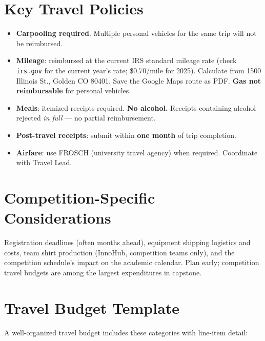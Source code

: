 \section{Key Travel Policies}
\begin{itemize}[nosep,leftmargin=1.5em]
\item \textbf{Carpooling required}. Multiple personal vehicles for the same trip will not be reimbursed.
\item \textbf{Mileage}: reimbursed at the current IRS standard mileage rate (check \texttt{irs.gov} for the current year's rate; \$0.70/mile for 2025). Calculate from 1500 Illinois St., Golden CO 80401. Save the Google Maps route as PDF. \textbf{Gas not reimbursable} for personal vehicles.
\item \textbf{Meals}: itemized receipts required. \textbf{No alcohol.} Receipts containing alcohol rejected \emph{in full} --- no partial reimbursement.
\item \textbf{Post-travel receipts}: submit within \textbf{one month} of trip completion.
\item \textbf{Airfare}: use FROSCH (university travel agency) when required. Coordinate with Travel Lead.
\end{itemize}

\section{Competition-Specific Considerations}
Registration deadlines (often months ahead), equipment shipping logistics and costs, team shirt production (InnoHub, competition teams only), and the competition schedule's impact on the academic calendar. Plan early; competition travel budgets are among the largest expenditures in capstone.


\section{Travel Budget Template}
A well-organized travel budget includes these categories with line-item detail:

